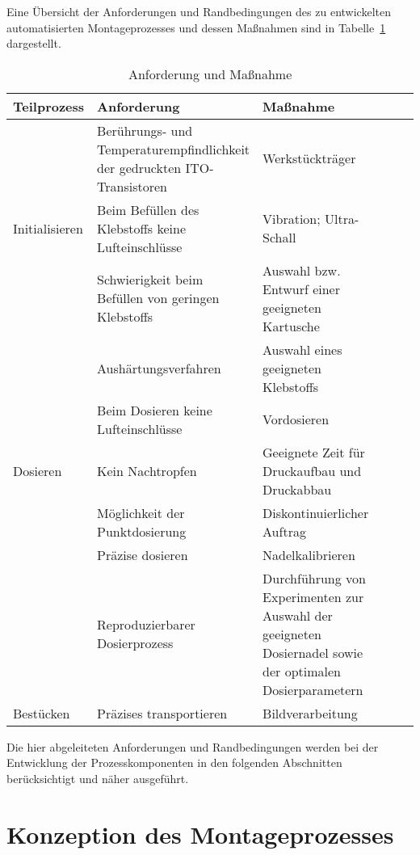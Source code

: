 Eine Übersicht der Anforderungen und Randbedingungen des zu entwickelten automatisierten Montageprozesses und dessen Maßnahmen sind in Tabelle~\ref{tab:anforderungmassnahme} dargestellt. 
\begin{table}[H]
    \centering
    \begin{tabular}{p{20mm}|p{62mm}|p{62mm}l|l|l}
    \hline
        Teilprozess & Anforderung   & Maßnahme\\ 
    \hline
        \multicolumn{1}{l|}{\multirow {3}{*}{Initialisieren}} & Berührungs- und Temperaturempfindlichkeit der gedruckten ITO-Transistoren & Werkstückträger \\
        \cline{2-3}
          & Beim Befüllen des Klebstoffs keine Lufteinschlüsse & Vibration; Ultra-Schall\\
          \cline{2-3}
          & Schwierigkeit beim Befüllen von geringen Klebstoffs & Auswahl bzw. Entwurf einer geeigneten Kartusche \\
         \cline{2-3}
          & Aushärtungsverfahren & Auswahl eines geeigneten Klebstoffs\\
         \hline
         \multicolumn{1}{l|}{\multirow {3}{*}{Dosieren}}& Beim Dosieren keine Lufteinschlüsse & Vordosieren\\
         \cline{2-3}
         ~ & Kein Nachtropfen & Geeignete Zeit für Druckaufbau und Druckabbau  \\
         \cline{2-3}
         ~ & Möglichkeit der Punktdosierung & Diskontinuierlicher Auftrag\\
         \cline{2-3}
         ~ & Präzise dosieren & Nadelkalibrieren \\
         \cline{2-3}
         ~ & Reproduzierbarer Dosierprozess & Durchführung von Experimenten zur Auswahl der geeigneten Dosiernadel sowie der optimalen Dosierparametern \\
         \hline
         Bestücken & Präzises transportieren & Bildverarbeitung\\
    \hline
    \end{tabular}
    \caption{Anforderung und Maßnahme}
    \label{tab:anforderungmassnahme}
\end{table}

Die hier abgeleiteten Anforderungen und Randbedingungen werden bei der Entwicklung der Prozesskomponenten in den folgenden Abschnitten berücksichtigt und näher ausgeführt.
\section{Konzeption des Montageprozesses}

